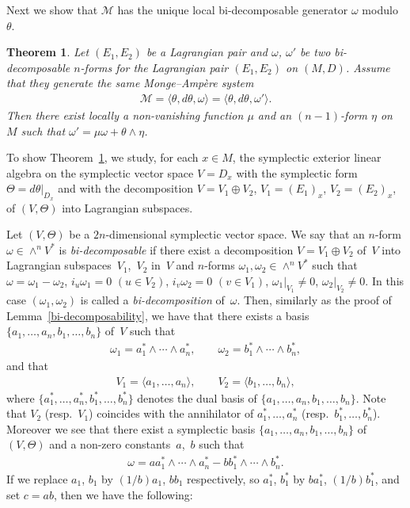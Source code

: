 \documentclass[pdftex]{sigma}
\newtheorem{Th}{Theorem}[section]
\begin{document}
Next we show that $\mathcal{M}$ has the unique
local bi-decomposable generator $\omega$ modulo $\theta$.

\begin{Th}
\label{bi-decomposable-form}
Let $(E_1, E_2)$ be a Lagrangian pair and
$\omega$, $\omega'$ be two bi-decomposable $n$-forms
for the Lagrangian pair $(E_1, E_2)$ on $(M, D)$.
Assume that they generate the same Monge--Amp{\`e}re system
\begin{gather*}
{\mathcal M} =
\langle \theta, d\theta, \omega \rangle
=
\langle \theta, d\theta, \omega' \rangle.
\end{gather*}
Then there exist
locally a non-vanishing function $\mu$ and an $(n-1)$-form $\eta$
on $M$ such that $\omega' = \mu \omega + \theta \wedge \eta$.
\end{Th}

To show Theorem~\ref{bi-decomposable-form},
we study, for each $x \in M$, the symplectic exterior linear algebra
on the symplectic vector space $V = D_x$ with the symplectic form
$\Theta = d\theta\vert_{D_x}$ and with the decomposition
$V = V_1\oplus V_2$, $V_1 = (E_1)_x$, $V_2 = (E_2)_x$,
of $(V, \Theta)$ into Lagrangian subspaces.


Let $(V,\Theta)$ be a $2n$-dimensional symplectic vector space.
We say that an $n$-form $\omega \in \wedge^n V^*$ is
{\it bi-decomposable} if
there exist a decomposition $V = V_1\oplus V_2$ of~$V$ into
Lagrangian sub\-spa\-ces~$V_1$,~$V_2$ in~$V$ and
$n$-forms $\omega_1, \omega_2 \in \wedge^n V^*$ such
that $\omega = \omega_1 - \omega_2$,
$i_u\omega_1 = 0$ $(u \in V_2)$, $i_v\omega_2 = 0$ $(v \in V_1)$,
$\omega_1\vert_{V_1} \not= 0$, $\omega_2\vert_{V_2} \not= 0$.
In this case $(\omega_1, \omega_2)$ is called a {\it bi-decomposition}
of~$\omega$.
Then, similarly as the proof of Lemma~\ref{bi-decomposability}, we have that
there exists a basis
$\{ a_1,\dots, a_n, b_1,\dots, b_n\}$ of~$V$
such that
\begin{gather*}
\omega_1 = a_1^*\wedge \cdots \wedge a_n^*, \qquad
\omega_2 = b_1^*\wedge \cdots \wedge b_n^*,
\end{gather*}
and that
\begin{gather*}
V_1= \langle a_1,\dots, a_n\rangle,
\qquad
V_2= \langle b_1,\dots, b_n\rangle,
\end{gather*}
where $\{ a_1^*,\dots, a_n^*, b_1^*,\dots, b_n^*\}$ denotes the dual basis
of $\{ a_1,\dots, a_n, b_1,\dots, b_n\}$.
Note that
$V_2$ (resp.~$V_1$) coincides with the annihilator of $a_1^*,\dots, a_n^*$
(resp.~$b_1^*,\dots, b_n^*$).
Moreover we see that
there exist a symplectic basis $\{ a_1,\dots, a_n, b_1,\dots, b_n\}$
of $(V, \Theta)$
and a non-zero constants~$a$,~$b$ such that
\begin{gather*}
\omega =
a   a_1^*\wedge \cdots \wedge a_n^* - b   b_1^*\wedge \cdots \wedge b_n^*.
\end{gather*}
If we replace $a_1$, $b_1$ by $(1/b) a_1$, $b b_1$
respectively,
so $a_1^*$, $b_1^*$ by $b a_1^*$, $(1/b) b_1^*$,
and set $c = ab$, then we have the following:
\end{document}
